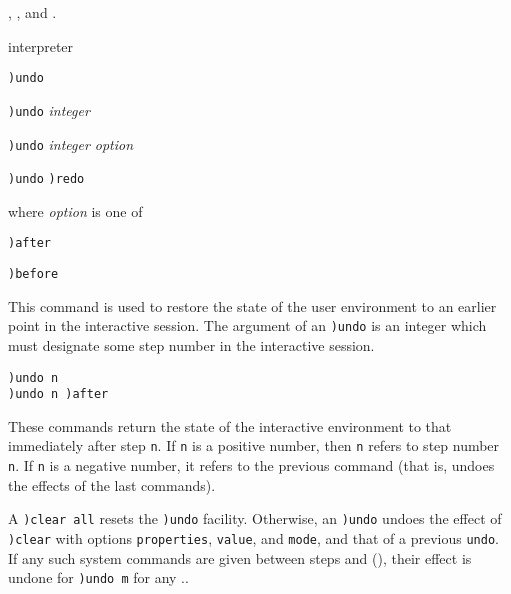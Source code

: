 {{{{{{{\par{}
,
, and
.



\par{} interpreter

\par{}
\begin{simpleList}
\item{\tt )undo}
\item{\tt )undo} {\it integer}
\item{\tt )undo} {\it integer \lanb{}option\ranb{}}
\item{\tt )undo} {\tt )redo}
\end{simpleList}
%
where {\it option} is one of
%
\begin{simpleList}
\item{\tt )after}
\item{\tt )before}
\end{simpleList}

\par{}

This command is used to
restore the state of the user environment to an earlier
point in the interactive session.
The argument of an {\tt )undo} is an integer which must designate some
step number in the interactive session.

\begin{verbatim}
)undo n
)undo n )after
\end{verbatim}
These commands return the state of the interactive
environment to that immediately after step {\tt n}.
If {\tt n} is a positive number, then {\tt n} refers to step number
{\tt n}. If {\tt n} is a negative number, it refers to the 
previous command (that is, undoes the effects of the last 
commands).

A {\tt )clear all} resets the {\tt )undo} facility.
Otherwise, an {\tt )undo} undoes the effect of {\tt )clear} with
options {\tt properties}, {\tt value}, and {\tt mode}, and
that of a previous {\tt undo}.
If any such system commands are given between steps  and
 (), their effect is undone
for {\tt )undo m} for any ..

}}}}}}}

